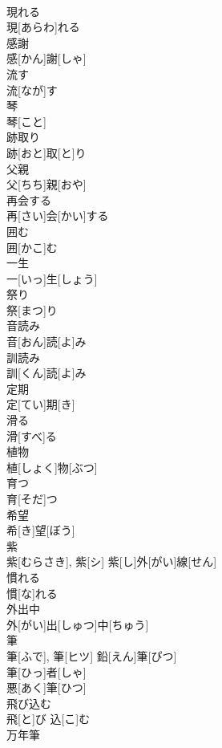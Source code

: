 \documentclass[8pt]{extreport}
\begin{document}
\begin{CJK}{UTF8}{min}
\\	現れる	
\\	現[あらわ]れる	
\\	感謝	
\\	感[かん]謝[しゃ]	
\\	流す	
\\	流[なが]す	
\\	琴	
\\	琴[こと]	
\\	跡取り	
\\	跡[おと]取[と]り	
\\	父親	
\\	父[ちち]親[おや]	
\\	再会する	
\\	再[さい]会[かい]する	
\\	囲む	
\\	囲[かこ]む	
\\	一生	
\\	一[いっ]生[しょう]	
\\	祭り	
\\	祭[まつ]り	
\\	音読み	
\\	音[おん]読[よ]み	
\\	訓読み	
\\	訓[くん]読[よ]み	
\\	定期	
\\	定[てい]期[き]	
\\	滑る	
\\	滑[すべ]る	
\\	植物	
\\	植[しょく]物[ぶつ]	
\\	育つ	
\\	育[そだ]つ	
\\	希望	
\\	希[き]望[ぼう]	
\\	紫	
\\	紫[むらさき], 紫[シ]	紫[し]外[がい]線[せん] 
\\	慣れる	
\\	慣[な]れる	
\\	外出中	
\\	外[がい]出[しゅつ]中[ちゅう]	
\\	筆	
\\	筆[ふで], 筆[ヒツ]	鉛[えん]筆[ぴつ] 
\\	筆[ひっ]者[しゃ] 
\\	悪[あく]筆[ひつ] 
\\	飛び込む	
\\	飛[と]び 込[こ]む	
\\	万年筆	

\end{CJK}
\end{document}
